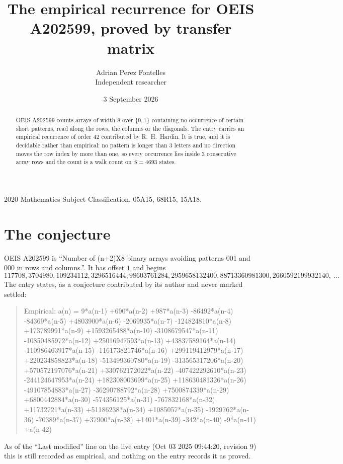 \documentclass[11pt,a4paper]{article}
\title{The empirical recurrence for OEIS A202599, proved by transfer matrix}
\author{Adrian Perez Fontelles\\ \small Independent researcher}
\date{3 September 2026}
\theoremstyle{plain}
\theoremstyle{definition}
\begin{document}
\maketitle

\begin{abstract}
OEIS A202599 counts arrays of width $8$ over $\{0,1\}$ containing no occurrence of certain short
patterns, read along the rows, the columns or the diagonals. The entry carries an empirical
recurrence of order $42$ contributed by R.~H.~Hardin. It is true, and it is decidable
rather than empirical: no pattern is longer than $3$ letters and no direction moves the row
index by more than one, so every occurrence lies inside $3$ consecutive array rows and the
count is a walk count on $S=4693$ states.
\end{abstract}

\noindent\small 2020 Mathematics Subject Classification. 05A15, 68R15, 15A18.\normalsize

\section{The conjecture}

OEIS A202599 is ``Number of (n+2)X8 binary arrays avoiding patterns 001 and 000 in rows and columns.''. It has offset $1$ and begins
\[
117708, 3704980, 109234112, 3296516444, 98603761284, 2959658132400, 88713360981300, 2660592199932140,\ \dots
\]
The entry states, as a conjecture contributed by its author and never marked settled:
\begin{quote}
Empirical: a(n) = 9*a(n-1) +690*a(n-2) +987*a(n-3) -86492*a(n-4) -84369*a(n-5) +4803900*a(n-6) -2069935*a(n-7) -124824810*a(n-8) +173789991*a(n-9) +1593265488*a(n-10) -3108679547*a(n-11) -10850485972*a(n-12) +25016947593*a(n-13) +43837589164*a(n-14) -110986463917*a(n-15) -116173821746*a(n-16) +299119412979*a(n-17) +220234858823*a(n-18) -513499360780*a(n-19) -313565317206*a(n-20) +570572197076*a(n-21) +330762172022*a(n-22) -407422292610*a(n-23) -244124647953*a(n-24) +182308003699*a(n-25) +118630481326*a(n-26) -49107854883*a(n-27) -36290788792*a(n-28) +7500874339*a(n-29) +6800442884*a(n-30) -574356125*a(n-31) -767832168*a(n-32) +11732721*a(n-33) +51186238*a(n-34) +1085057*a(n-35) -1929762*a(n-36) -70389*a(n-37) +37900*a(n-38) +1401*a(n-39) -342*a(n-40) -9*a(n-41) +a(n-42)
\end{quote}
As of the ``Last modified'' line on the live entry (Oct 03 2025 09:44:20, revision 9) this is still
recorded as empirical, and nothing on the entry records it as proved.
\end{document}

